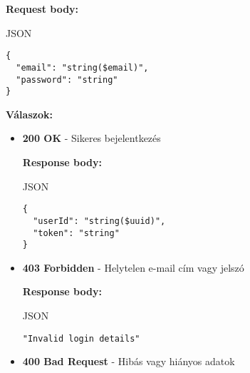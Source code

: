 \documentclass[12pt]{report}
\begin{document}
\begin{description}
    \vspace{0.5cm}
    \textbf{Request body:}
    \begin{codeblock}{JSON}
      \begin{verbatim}
{
  "email": "string($email)",
  "password": "string"
}
      \end{verbatim}
    \end{codeblock}

    \vspace{0.5cm}
    \textbf{Válaszok:}
    \begin{itemize}
      \item \textbf{200 OK} - Sikeres bejelentkezés
      
        \textbf{Response body:}
        \begin{codeblock}{JSON}
          \begin{verbatim}
{
  "userId": "string($uuid)",
  "token": "string"
}
          \end{verbatim}
        \end{codeblock}
      \item \textbf{403 Forbidden} - Helytelen e-mail cím vagy jelszó

        \textbf{Response body:}
        \begin{codeblock}{JSON}
          \begin{verbatim}
"Invalid login details"
          \end{verbatim}
        \end{codeblock}

      \item \textbf{400 Bad Request} - Hibás vagy hiányos adatok
    \end{itemize}

\end{description}

\vspace{0.5cm}
\end{document}
